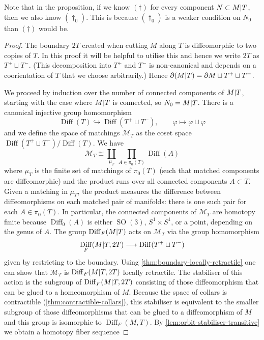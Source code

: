 \documentclass{amsart}
\theoremstyle{plain}
\theoremstyle{definition}
\DeclareMathOperator\Diff{Diff}
\DeclareMathOperator\SO{SO}
\newcommand{\ca}{\smash{\mid}} %
\newcommand{\calM}{\mathcal{M}}
\begin{document}
Note that in the proposition, if we know $(\dagger)$ for every component $N \subset M \ca T$, then we also know $(\dagger_0)$. 
This is because $(\dagger_0)$ is a weaker condition on $N_0$ than $(\dagger)$ would be.

\begin{proof}
    The boundary $2T$ created when cutting $M$ along $T$ is diffeomorphic to two copies of $T$. In this proof it will be helpful to utilise this and hence we write $2T$ as $T^+ \sqcup T^-$.
    (This decomposition into $T^+$ and $T^-$ is non-canonical and depends on a coorientation of $T$ that we choose arbitrarily.)
    Hence $\partial (M \ca T) = \partial M \sqcup T^+ \sqcup T^-$.

    We proceed by induction over the number of connected components of $M \ca T$, starting with the case where $M \ca T$ is connected, so $N_0 = M \ca T$.
    There is a canonical injective group homomorphism
    \[
        \Diff(T) \hookrightarrow \Diff(T^+ \sqcup T^-), \qquad
        \varphi \mapsto \varphi \sqcup \varphi
    \]
    and we define the space of matchings $\calM_{T}$ as the coset space $\Diff(T^+ \sqcup T^-)/\Diff(T)$. We have  $$\calM_{T} \cong\coprod_{\mu_T} \prod_{A \in \pi_0(T)} \Diff(A)$$ where $\mu_T$ is the finite set of matchings of $\pi_0(T)$ (such that matched components are diffeomorphic) and the product runs over all connected components $A \subset T$. Given a matching in $\mu_T$, the product measures the difference between diffeomorphisms on each matched pair of manifolds: there is one such pair for each $A\in \pi_0(T)$. 
    In particular, the connected components of $\calM_{T}$ are homotopy finite because $\Diff_0(A)$ is either $\SO(3)$, $S^1 \times S^1$, or a point, depending on the genus of $A$.
    The group $\Diff_F(M \ca T)$ acts on $\calM_T$ via the group homomorphism
    \[  
        \Diff_F(M \ca T, 2T) \longrightarrow \Diff(T^+ \sqcup T^-)
    \]
    given by restricting to the boundary.
    Using \cref{thm:boundary-locally-retractile} one can show that $\calM_T$ is $\Diff_F(M \ca T, 2T)$ locally retractile.
    The stabiliser of this action is the subgroup of $\Diff_F(M \ca T, 2T)$ consisting of those diffeomorphism that can be glued to a homeomorphism of $M$.
    Because the space of collars is contractible (\cref{thm:contractible-collars}), this stabiliser is equivalent to the smaller subgroup of those diffeomorphisms that can be glued to a diffeomorphism of $M$ and this group is isomorphic to $\Diff_F(M, T)$.
    By \cref{lem:orbit-stabiliser-transitive} we obtain a homotopy fiber sequence

\end{proof}
\end{document}
